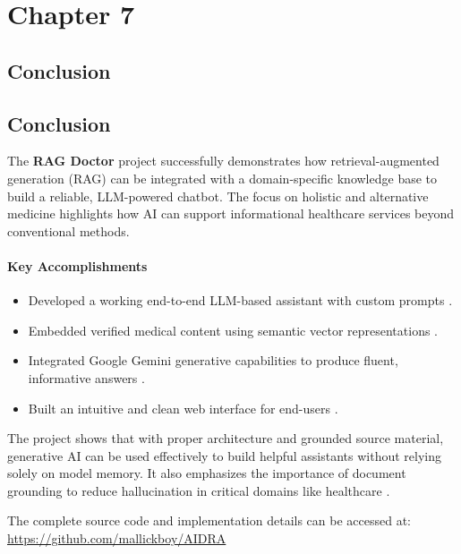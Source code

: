 \documentclass[12pt,a4paper]{report}
\begin{document}
	{\vfill \chapter*{\centering \vfill Chapter 7 \vfill}\vfill}
	\thispagestyle{empty}
	\newpage
	\label{Conclusion}
	\section{Conclusion}


\section{Conclusion}
\label{Conclusion}

The \textbf{RAG Doctor} project successfully demonstrates how retrieval-augmented generation (RAG) can be integrated with a domain-specific knowledge base to build a reliable, LLM-powered chatbot. The focus on holistic and alternative medicine highlights how AI can support informational healthcare services beyond conventional methods.

\subsubsection*{Key Accomplishments}
\begin{itemize}
    \item Developed a working end-to-end LLM-based assistant with custom prompts \cite{chatgpt}.
    \item Embedded verified medical content using semantic vector representations \cite{sentence_transformers}.
    \item Integrated Google Gemini generative capabilities to produce fluent, informative answers \cite{google_tts}.
    \item Built an intuitive and clean web interface for end-users \cite{reactjs}.
\end{itemize}

The project shows that with proper architecture and grounded source material, generative AI can be used effectively to build helpful assistants without relying solely on model memory. It also emphasizes the importance of document grounding to reduce hallucination in critical domains like healthcare \cite{langchain}.

\vspace{0.5cm}
The complete source code and implementation details can be accessed at: \url{https://github.com/mallickboy/AIDRA}









	\newpage




% 
% 
 

	
\end{document}
